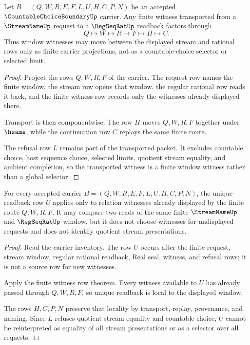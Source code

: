 \begin{theorem}
\label{thm:countable-choice-boundary-window-transport}
Let $B=(Q,W,R,E,F,L,U,H,C,P,N)$ be an accepted $\CountableChoiceBoundaryUp$ carrier. Any finite witness transported from a $\StreamNameUp$ request to a $\RegSeqRatUp$ readback factors through
$$
Q \longmapsto W \longmapsto R \longmapsto F \longmapsto H \longmapsto C .
$$
Thus window witnesses may move between the displayed stream and rational rows only as finite carrier projections, not as a countable-choice selector or selected limit.
\end{theorem}
\begin{proof}
Project the rows $Q,W,R,F$ of the carrier. The request row names the finite window, the stream row opens that window, the regular rational row reads it back, and the finite witness row records only the witnesses already displayed there.

Transport is then componentwise. The row $H$ moves $Q,W,R,F$ together under $\hsame$, while the continuation row $C$ replays the same finite route.

The refusal row $L$ remains part of the transported packet. It excludes countable choice, host sequence choice, selected limits, quotient stream equality, and ambient completion, so the transported witness is a finite window witness rather than a global selector.
\end{proof}

\begin{theorem}
\label{thm:countable-choice-boundary-unique-readback-locality}
For every accepted carrier $B=(Q,W,R,E,F,L,U,H,C,P,N)$, the unique-readback row $U$ applies only to relation witnesses already displayed by the finite route $Q,W,R,F$. It may compare two reads of the same finite $\StreamNameUp$ and $\RegSeqRatUp$ window, but it does not choose witnesses for undisplayed requests and does not identify quotient stream presentations.
\end{theorem}
\begin{proof}
Read the carrier inventory. The row $U$ occurs after the finite request, stream window, regular rational readback, Real seal, witness, and refusal rows; it is not a source row for new witnesses.

Apply the finite witness row theorem. Every witness available to $U$ has already passed through $Q,W,R,F$, so unique readback is local to the displayed window.

The rows $H,C,P,N$ preserve that locality by transport, replay, provenance, and naming. Since $L$ refuses quotient stream equality and countable choice, $U$ cannot be reinterpreted as equality of all stream presentations or as a selector over all requests.
\end{proof}

